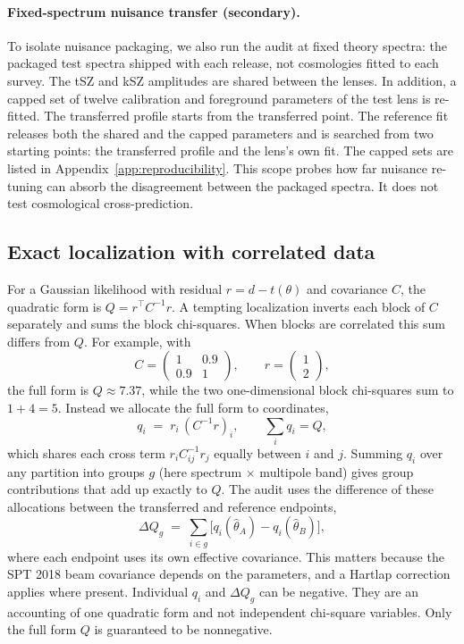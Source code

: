 \paragraph{Fixed-spectrum nuisance transfer (secondary).}
To isolate nuisance packaging, we also run the audit at fixed theory spectra: the packaged test spectra shipped with each release, not cosmologies fitted to each survey. The tSZ and kSZ amplitudes are shared between the lenses. In addition, a capped set of twelve calibration and foreground parameters of the test lens is re-fitted. The transferred profile starts from the transferred point. The reference fit releases both the shared and the capped parameters and is searched from two starting points: the transferred profile and the lens's own fit. The capped sets are listed in Appendix~\ref{app:reproducibility}. This scope probes how far nuisance re-tuning can absorb the disagreement between the packaged spectra. It does not test cosmological cross-prediction.

\subsection{Exact localization with correlated data}
\label{sec:ledger}

For a Gaussian likelihood with residual $r=d-t(\theta)$ and covariance $C$, the quadratic form is $Q=r^\top C^{-1}r$. A tempting localization inverts each block of $C$ separately and sums the block chi-squares. When blocks are correlated this sum differs from $Q$. For example, with
\[
  C=\begin{pmatrix}1&0.9\\0.9&1\end{pmatrix},\qquad r=\begin{pmatrix}1\\2\end{pmatrix},
\]
the full form is $Q\approx7.37$, while the two one-dimensional block chi-squares sum to $1+4=5$. Instead we allocate the full form to coordinates,
\begin{equation}
  q_i \;=\; r_i\,(C^{-1}r)_i, \qquad \sum_i q_i = Q,
  \label{eq:signed_alloc}
\end{equation}
which shares each cross term $r_iC^{-1}_{ij}r_j$ equally between $i$ and $j$. Summing $q_i$ over any partition into groups $g$ (here spectrum $\times$ multipole band) gives group contributions that add up exactly to $Q$. The audit uses the difference of these allocations between the transferred and reference endpoints,
\begin{equation}
  \Delta Q_g \;=\; \sum_{i\in g}\bigl[q_i(\hat\theta_A)-q_i(\hat\theta_B)\bigr],
  \label{eq:block_dchi}
\end{equation}
where each endpoint uses its own effective covariance. This matters because the SPT 2018 beam covariance depends on the parameters, and a Hartlap correction applies where present. Individual $q_i$ and $\Delta Q_g$ can be negative. They are an accounting of one quadratic form and not independent chi-square variables. Only the full form $Q$ is guaranteed to be nonnegative.

